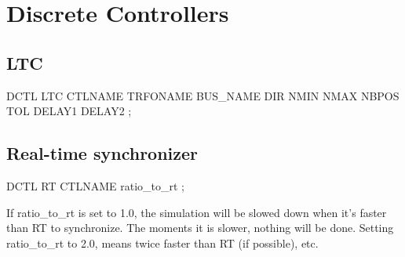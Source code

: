 \section{Discrete Controllers}


\subsection{LTC}

DCTL LTC CTLNAME TRFONAME BUS\_NAME DIR NMIN
NMAX NBPOS TOL DELAY1 DELAY2 ; 

\subsection{Real-time synchronizer}

DCTL RT CTLNAME ratio\_to\_rt ; 

If ratio\_to\_rt is set to 1.0, the simulation will be slowed down
when it's faster than RT to synchronize. The moments it is slower,
nothing will be done. Setting ratio\_to\_rt to 2.0, means twice faster
than RT (if possible), etc.



%
%
%


